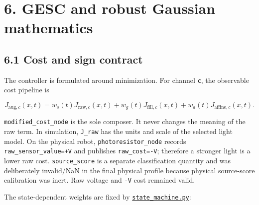 \documentclass[
  10pt,
  letterpaper,
]{article}
\begin{document}
\section{6. GESC and robust Gaussian mathematics}\label{gesc-and-robust-gaussian-mathematics}

\subsection{6.1 Cost and sign contract}\label{cost-and-sign-contract}

The controller is formulated around minimization. For channel \nolinkurl{c}, the
observable cost pipeline is

\[
J_{\mathrm{aug},c}(x,t)=w_s(t)J_{\mathrm{raw},c}(x,t)
+w_g(t)J_{\mathrm{fill},c}(x,t)
+w_a(t)J_{\mathrm{affine},c}(x,t).
\]

\nolinkurl{modified\_cost\_node} is the sole composer. It never changes the meaning of the
raw term. In simulation, \nolinkurl{J\_raw} has the units and scale of the selected light
model. On the physical robot, \nolinkurl{photoresistor\_node} records
\nolinkurl{raw\_sensor\_value=+V} and publishes \nolinkurl{raw\_cost=-V}; therefore a stronger light
is a lower raw cost. \nolinkurl{source\_score} is a separate classification quantity and
was deliberately invalid/NaN in the final physical profile because physical
source-score calibration was inert. Raw voltage and \nolinkurl{-V} cost remained valid.

The state-dependent weights are fixed by
\href{../../../ros2_ws/src/ros_esc/ros_esc/supervisor_node/state_machine.py}{\nolinkurl{state\_machine.py}}:
\end{document}
